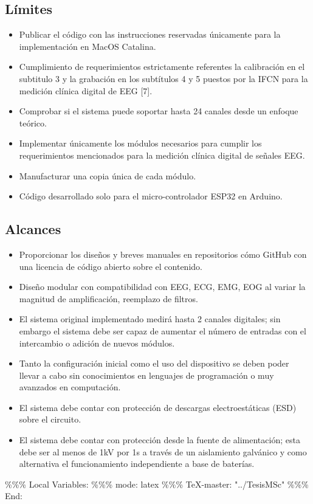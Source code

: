 \documentclass[11pt]{article}
\begin{document}
\subsection{Límites}
\label{sec:org91973ad}
\begin{itemize}
\item Publicar el código con las instrucciones reservadas únicamente para la implementación en MacOS Catalina.
\item Cumplimiento de requerimientos estrictamente referentes la calibración en el subtitulo 3 y la grabación en los subtítulos 4 y 5 puestos por la IFCN para la medición clínica digital de EEG [7].
\item Comprobar si el sistema puede soportar hasta 24 canales desde un enfoque teórico.
\item Implementar únicamente los módulos necesarios para cumplir los requerimientos mencionados para la medición clínica digital de señales EEG.
\item Manufacturar una copia única de cada módulo.
\item Código desarrollado solo para el micro-controlador ESP32 en Arduino.
\end{itemize}

\subsection{Alcances}
\label{sec:org94ea06d}
\begin{itemize}
\item Proporcionar los diseños y breves manuales en repositorios cómo GitHub con una licencia de código abierto sobre el contenido.
\item Diseño modular con compatibilidad con EEG, ECG, EMG, EOG al variar la magnitud de amplificación, reemplazo de filtros.
\item El sistema original implementado medirá hasta 2 canales digitales; sin embargo el sistema debe ser capaz de aumentar el número de entradas con el intercambio o adición de nuevos módulos.
\item Tanto la configuración inicial como el uso del dispositivo se deben poder llevar a cabo sin conocimientos en lenguajes de programación o muy avanzados en computación.
\item El sistema debe contar con protección de descargas electroestáticas (ESD) sobre el circuito.
\item El sistema debe contar con protección desde la fuente de alimentación; esta debe ser al menos de 1kV por 1s a través de un aislamiento galvánico y como alternativa el funcionamiento independiente a base de baterías.
\end{itemize}

\%\%\% Local Variables:
\%\%\% mode: latex
\%\%\% \TeX{}-master: "../TesisMSc"
\%\%\% End:
\end{document}
